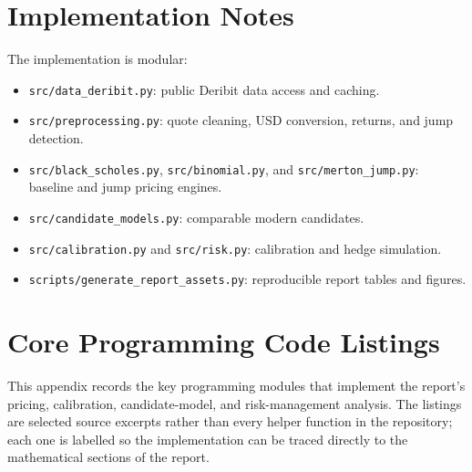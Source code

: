 \documentclass[11pt]{article}
\begin{document}
\clearpage
\appendix
\section{Implementation Notes}

The implementation is modular:
\begin{itemize}
\item \texttt{src/data\_deribit.py}: public Deribit data access and caching.
\item \texttt{src/preprocessing.py}: quote cleaning, USD conversion, returns, and jump detection.
\item \texttt{src/black\_scholes.py}, \texttt{src/binomial.py}, and \texttt{src/merton\_jump.py}: baseline and jump pricing engines.
\item \texttt{src/candidate\_models.py}: comparable modern candidates.
\item \texttt{src/calibration.py} and \texttt{src/risk.py}: calibration and hedge simulation.
\item \texttt{scripts/generate\_report\_assets.py}: reproducible report tables and figures.
\end{itemize}

\clearpage
\section{Core Programming Code Listings}

This appendix records the key programming modules that implement the report's pricing, calibration, candidate-model, and risk-management analysis. The listings are selected source excerpts rather than every helper function in the repository; each one is labelled so the implementation can be traced directly to the mathematical sections of the report.






\end{document}
